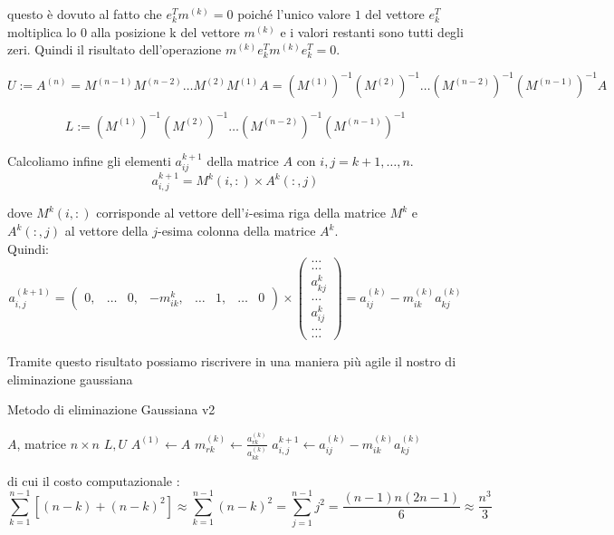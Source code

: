 \documentclass[12pt, a4paper]{book}
\theoremstyle{definition}
\begin{document}
\begin{flushleft}
questo è dovuto al fatto che  $e^{T}_{k}m^{(k)} = 0$ poiché l'unico valore $1$ del vettore $e^{T}_{k}$ moltiplica lo $0$ alla posizione k del vettore $m^{(k)}$ e i valori restanti sono tutti degli zeri.  Quindi il risultato dell'operazione $m^{(k)}e^{T}_{k}m^{(k)}e^{T}_{k} = 0$.

\[ 
	U := A^{(n)} = M^{(n-1)} M^{(n-2)} \dots M^{(2)} M^{(1)} A = (M^{(1)} )^{-1}(M^{(2)} )^{-1} \dots (M^{(n-2)} )^{-1}(M^{(n-1)} )^{-1}A
\]

\[
	L := (M^{(1)} )^{-1}(M^{(2)} )^{-1} \dots (M^{(n-2)} )^{-1}(M^{(n-1)} )^{-1}
\]

Calcoliamo infine gli elementi $a^{k+1}_{ij}$ della matrice $A$ con $i,j = k+1, \dots, n$.
\[
	a^{k+1}_{i,j} = M^{k} (i,:) \times A^{k} (:,j)
\]

dove $M^{k} (i,:)$ corrisponde al vettore dell'$i$-esima riga della matrice $M^{k}$ e $A^{k} (:,j)$ al vettore della $j$-esima colonna della matrice $A^{k}$.\\

Quindi: 
\[
	a^{(k+1)}_{i,j} = 
	\begin{pmatrix} 0, & \dots & 0, & -m^{k}_{ik}, & \dots & 1, & \dots & 0 \end{pmatrix}
	\times
	\begin{pmatrix} 
		\dots \\
		\dots \\
		a^{k}_{kj} \\ 
		\dots \\
		a^{k}_{ij} \\ 
		\dots  \\
		\dots 
	\end{pmatrix}
	= a^{(k)}_{ij} - m^{(k)}_{ik} a^{(k)}_{kj}	
\]

Tramite questo risultato possiamo riscrivere in una maniera più agile il nostro di eliminazione gaussiana

\begin{algorithm}
\caption{Metodo di eliminazione Gaussiana v2}
	\begin{algorithmic} 
		\REQUIRE $A$, matrice $n \times n$
		\ENSURE $L,U$
		\STATE $ A^{(1)} \leftarrow  A$
				\STATE $m^{(k)}_{rk} \leftarrow \frac{a^{(k)}_{rk}}{a^{(k)}_{kk}}$
			\ENDFOR
					\STATE $a^{k+1}_{i,j} \leftarrow a^{(k)}_{ij} - m^{(k)}_{ik} a^{(k)}_{kj}$
				\ENDFOR
			\ENDFOR
		\ENDFOR
	\end{algorithmic}
\end{algorithm}

di cui il costo computazionale :
\[ 
	\sum^{n-1}_{k = 1}\left[ (n-k) + (n-k)^{2} \right] 
	\approx \sum^{n-1}_{k = 1}(n-k)^{2} 
	= \sum^{n-1}_{j=1}j^{2} 
	= \frac{(n-1)n(2n-1)}{6}
	\approx
	\frac{n^{3}}{3}
\]

\end{flushleft}
\end{document}

